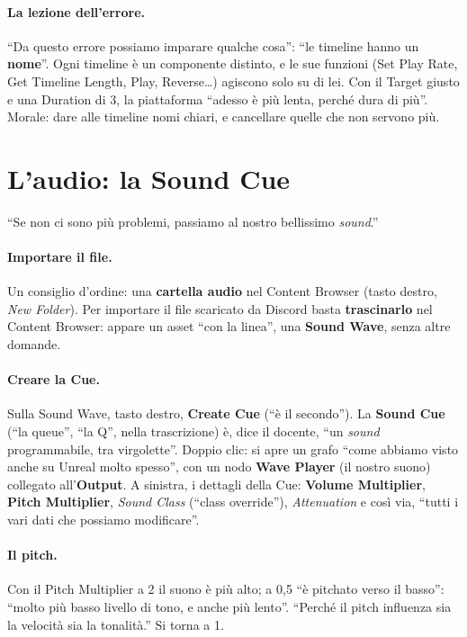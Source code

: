 \paragraph{La lezione dell'errore.} ``Da questo errore possiamo imparare qualche cosa'':
``le timeline hanno un \textbf{nome}''. Ogni timeline è un componente distinto, e le sue
funzioni (Set Play Rate, Get Timeline Length, Play, Reverse\ldots) agiscono solo su di
lei. Con il Target giusto e una Duration di 3, la piattaforma ``adesso è più lenta,
perché dura di più''. Morale: dare alle timeline nomi chiari, e cancellare quelle che non
servono più.

\section{L'audio: la Sound Cue}
\label{ue6:sec:cue}

``Se non ci sono più problemi, passiamo al nostro bellissimo \emph{sound}.''

\paragraph{Importare il file.} Un consiglio d'ordine: una \textbf{cartella audio} nel
Content Browser (tasto destro, \emph{New Folder}). Per importare il file scaricato da
Discord basta \textbf{trascinarlo} nel Content Browser: appare un asset ``con la linea'',
una \textbf{Sound Wave}, senza altre domande.

\paragraph{Creare la Cue.} Sulla Sound Wave, tasto destro, \textbf{Create Cue} (``è il
secondo''). La \textbf{Sound Cue} (``la queue'', ``la Q'', nella trascrizione) è, dice il
docente, ``un \emph{sound} programmabile, tra virgolette''. Doppio clic: si apre un grafo
``come abbiamo visto anche su Unreal molto spesso'', con un nodo \textbf{Wave Player}
(il nostro suono) collegato all'\textbf{Output}. A sinistra, i dettagli della Cue:
\textbf{Volume Multiplier}, \textbf{Pitch Multiplier}, \emph{Sound Class} (``class
override''), \emph{Attenuation} e così via, ``tutti i vari dati che possiamo
modificare''.

\paragraph{Il pitch.} Con il Pitch Multiplier a 2 il suono è più alto; a 0,5 ``è pitchato
verso il basso'': ``molto più basso livello di tono, e anche più lento''. ``Perché il
pitch influenza sia la velocità sia la tonalità.'' Si torna a 1.

